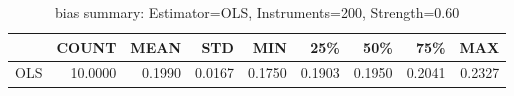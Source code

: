 \begin{table}[ht]
\centering
\caption{bias summary: Estimator=OLS, Instruments=200, Strength=0.60}
\begin{tabular}{lrrrrrrrr}
\toprule
 & COUNT & MEAN & STD & MIN & 25\% & 50\% & 75\% & MAX \\
\midrule
OLS & 10.0000 & 0.1990 & 0.0167 & 0.1750 & 0.1903 & 0.1950 & 0.2041 & 0.2327 \\
\bottomrule
\end{tabular}
\end{table}
